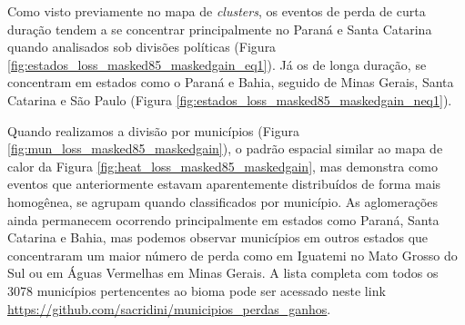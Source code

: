 Como visto previamente no mapa de \textit{clusters}, os eventos de perda de curta duração tendem a se concentrar principalmente no Paraná e Santa Catarina quando analisados sob divisões políticas (Figura \ref{fig:estados_loss_masked85_maskedgain_eq1}). Já os de longa duração, se concentram em estados como o Paraná e Bahia, seguido de Minas Gerais, Santa Catarina e São Paulo (Figura \ref{fig:estados_loss_masked85_maskedgain_neq1}).

Quando realizamos a divisão por municípios (Figura \ref{fig:mun_loss_masked85_maskedgain}), o padrão espacial similar ao mapa de calor da Figura \ref{fig:heat_loss_masked85_maskedgain}, mas demonstra como eventos que anteriormente estavam aparentemente distribuídos de forma mais homogênea, se agrupam quando classificados por município. As aglomerações ainda permanecem ocorrendo principalmente em estados como Paraná, Santa Catarina e Bahia, mas podemos observar municípios em outros estados que concentraram um maior número de perda como em Iguatemi no Mato Grosso do Sul ou em Águas Vermelhas em Minas Gerais. A lista completa com todos os 3078 municípios pertencentes ao bioma pode ser acessado neste link \url{https://github.com/sacridini/municipios_perdas_ganhos}.

